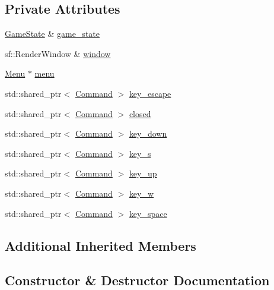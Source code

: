 \subsection*{Private Attributes}
\begin{DoxyCompactItemize}
\item 
\hyperlink{class_game_state}{Game\+State} \& \hyperlink{class_menu_input_handler_a6574e69d6344c10cb1dd53c6e2ffac26}{game\+\_\+state}
\item 
sf\+::\+Render\+Window \& \hyperlink{class_menu_input_handler_a2d53ce9f0554202b62c1640ef95e799b}{window}
\item 
\hyperlink{class_menu}{Menu} $\ast$ \hyperlink{class_menu_input_handler_adda8b05fe971a0ed749bb0037d3ba4bd}{menu}
\item 
std\+::shared\+\_\+ptr$<$ \hyperlink{class_command}{Command} $>$ \hyperlink{class_menu_input_handler_abf019bb1ca2f82975870e932e3cbd558}{key\+\_\+escape}
\item 
std\+::shared\+\_\+ptr$<$ \hyperlink{class_command}{Command} $>$ \hyperlink{class_menu_input_handler_a493334cca9bde4229be296ad44e3db9b}{closed}
\item 
std\+::shared\+\_\+ptr$<$ \hyperlink{class_command}{Command} $>$ \hyperlink{class_menu_input_handler_a29143574ca3b79dccb3a98260184968c}{key\+\_\+down}
\item 
std\+::shared\+\_\+ptr$<$ \hyperlink{class_command}{Command} $>$ \hyperlink{class_menu_input_handler_aa16ab7856da1bc4c6dea371e244939fb}{key\+\_\+s}
\item 
std\+::shared\+\_\+ptr$<$ \hyperlink{class_command}{Command} $>$ \hyperlink{class_menu_input_handler_ae1b3b9df835e3182dba3bbf1fd8b98aa}{key\+\_\+up}
\item 
std\+::shared\+\_\+ptr$<$ \hyperlink{class_command}{Command} $>$ \hyperlink{class_menu_input_handler_a052c981814cc918c88d17d7b4f0deb0e}{key\+\_\+w}
\item 
std\+::shared\+\_\+ptr$<$ \hyperlink{class_command}{Command} $>$ \hyperlink{class_menu_input_handler_a8f596f6b958c7007a3ccc44ac3d8666e}{key\+\_\+space}
\end{DoxyCompactItemize}
\subsection*{Additional Inherited Members}


\subsection{Constructor \& Destructor Documentation}
\hypertarget{class_menu_input_handler_a244c829acc6ffe44795e44cb2980615b}{}
